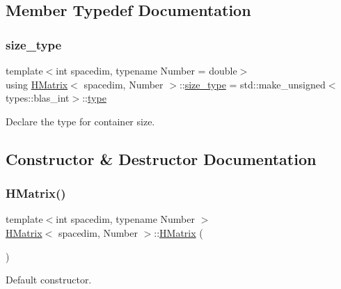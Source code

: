 \subsection{Member Typedef Documentation}
\mbox{\label{classHMatrix_a5ca8dc549783d38371a01ecd621ecb34}} 
\subsubsection{\texorpdfstring{size\+\_\+type}{size\_type}}
{\footnotesize\ttfamily template$<$int spacedim, typename Number = double$>$ \\
using \hyperlink{classHMatrix}{H\+Matrix}$<$ spacedim, Number $>$\+::\hyperlink{classHMatrix_a5ca8dc549783d38371a01ecd621ecb34}{size\+\_\+type} =  std\+::make\+\_\+unsigned$<$types\+::blas\+\_\+int$>$\+::\hyperlink{classHMatrix_a89ef60f3ba737c04708195ca0bb13620}{type}}

Declare the type for container size. 

\subsection{Constructor \& Destructor Documentation}
\mbox{\label{classHMatrix_ae3dc35e1aefee2580d27ad2d65c906de}} 
\subsubsection{\texorpdfstring{H\+Matrix()}{HMatrix()}\hspace{0.1cm}{\footnotesize\ttfamily [1/9]}}
{\footnotesize\ttfamily template$<$int spacedim, typename Number $>$ \\
\hyperlink{classHMatrix}{H\+Matrix}$<$ spacedim, Number $>$\+::\hyperlink{classHMatrix}{H\+Matrix} (\begin{DoxyParamCaption}{ }\end{DoxyParamCaption})}

Default constructor. \mbox{\label{classHMatrix_a6a4dead0321e8df38865bf6fbd0f6e81}} 
